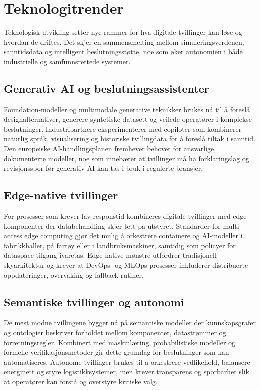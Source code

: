 \section{Teknologitrender}
Teknologisk utvikling setter nye rammer for hva digitale tvillinger kan løse og hvordan de driftes. Det skjer en sammensmelting mellom simuleringsverdenen, sanntidsdata og intelligent beslutningsstøtte, noe som øker autonomien i både industrielle og samfunnsrettede systemer.

\subsection{Generativ AI og beslutningsassistenter}
Foundation-modeller og multimodale generative teknikker brukes nå til å foreslå designalternativer, generere syntetiske datasett og veilede operatører i komplekse beslutninger. Industripartnere eksperimenterer med copiloter som kombinerer naturlig språk, visualisering og historiske tvillingdata for å foreslå tiltak i sanntid.\citep{siemens2023copilot} Den europeiske AI-handlingsplanen fremhever behovet for ansvarlige, dokumenterte modeller, noe som innebærer at tvillinger må ha forklaringslag og revisjonsspor før generativ AI kan tas i bruk i regulerte bransjer.\citep{eu2023ai}

\subsection{Edge-native tvillinger}
For prosesser som krever lav responstid kombineres digitale tvillinger med edge-komponenter der databehandling skjer tett på utstyret. Standarder for multi-access edge computing gjør det mulig å orkestrere containere og AI-modeller i fabrikkhaller, på fartøy eller i landbruksmaskiner, samtidig som policyer for dataspace-tilgang ivaretas.\citep{etsi2023mec} Edge-native mønstre utfordrer tradisjonell skyarkitektur og krever at DevOps- og MLOps-prosesser inkluderer distribuerte oppdateringer, overvåking og fallback-rutiner.

\subsection{Semantiske tvillinger og autonomi}
De mest modne tvillingene bygger nå på semantiske modeller der kunnskapsgrafer og ontologier beskriver forholdet mellom komponenter, datastrømmer og forretningsregler. Kombinert med maskinlæring, probabilistiske modeller og formelle verifikasjonsmetoder gir dette grunnlag for beslutninger som kan automatiseres. Autonome tvillinger brukes til å orkestrere vedlikehold, balansere energinett og styre logistikksystemer, men krever transparens og sporbarhet slik at operatører kan forstå og overstyre kritiske valg.

